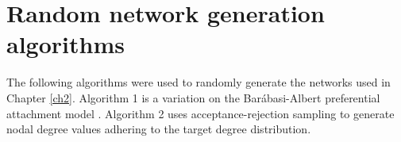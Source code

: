 
\chapter{Random network generation algorithms}
\label{appA}

The following algorithms were used to randomly generate the networks used in Chapter \ref{ch2}. Algorithm 1 is a variation on the Bar\'{a}basi-Albert preferential attachment model \cite{Albert2002}.  Algorithm 2 uses acceptance-rejection sampling to generate nodal degree values adhering to the target degree distribution.

